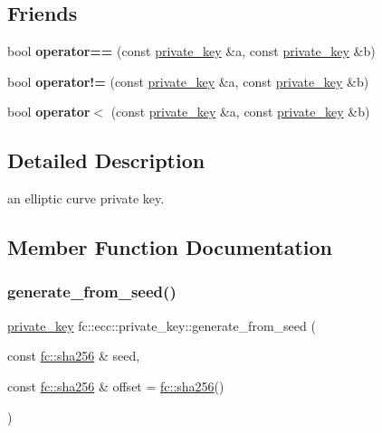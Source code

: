 \subsection*{Friends}
\begin{DoxyCompactItemize}
\item 
\mbox{\label{classfc_1_1ecc_1_1private__key_af279e37c180aa326645bdb542b9be656}} 
bool {\bfseries operator==} (const \mbox{\hyperlink{classfc_1_1ecc_1_1private__key}{private\+\_\+key}} \&a, const \mbox{\hyperlink{classfc_1_1ecc_1_1private__key}{private\+\_\+key}} \&b)
\item 
\mbox{\label{classfc_1_1ecc_1_1private__key_a542c2210ae96b8326314deb182aef678}} 
bool {\bfseries operator!=} (const \mbox{\hyperlink{classfc_1_1ecc_1_1private__key}{private\+\_\+key}} \&a, const \mbox{\hyperlink{classfc_1_1ecc_1_1private__key}{private\+\_\+key}} \&b)
\item 
\mbox{\label{classfc_1_1ecc_1_1private__key_a07832f781f3f9ce28ecba02777a9c6df}} 
bool {\bfseries operator$<$} (const \mbox{\hyperlink{classfc_1_1ecc_1_1private__key}{private\+\_\+key}} \&a, const \mbox{\hyperlink{classfc_1_1ecc_1_1private__key}{private\+\_\+key}} \&b)
\end{DoxyCompactItemize}


\subsection{Detailed Description}
an elliptic curve private key. 

\subsection{Member Function Documentation}
\mbox{\label{classfc_1_1ecc_1_1private__key_a748751090ea736a761cd3af9633eb7de}} 
\subsubsection{\texorpdfstring{generate\+\_\+from\+\_\+seed()}{generate\_from\_seed()}}
{\footnotesize\ttfamily \mbox{\hyperlink{classfc_1_1ecc_1_1private__key}{private\+\_\+key}} fc\+::ecc\+::private\+\_\+key\+::generate\+\_\+from\+\_\+seed (\begin{DoxyParamCaption}\item[{const \mbox{\hyperlink{classfc_1_1sha256}{fc\+::sha256}} \&}]{seed,  }\item[{const \mbox{\hyperlink{classfc_1_1sha256}{fc\+::sha256}} \&}]{offset = {\ttfamily \mbox{\hyperlink{classfc_1_1sha256}{fc\+::sha256}}()} }\end{DoxyParamCaption})\hspace{0.3cm}{\ttfamily [static]}}

